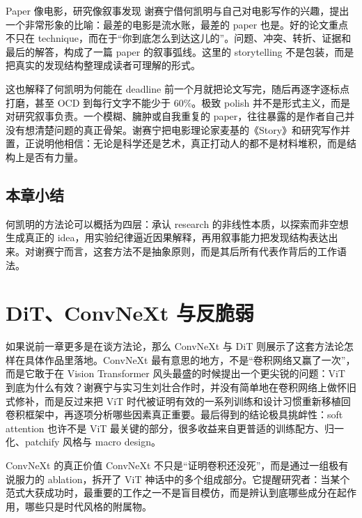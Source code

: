 \documentclass[a4paper,12pt]{article}
\begin{document}
\begin{importantbox}{Paper 像电影，研究像叙事发现}
谢赛宁借何凯明与自己对电影写作的兴趣，提出一个非常形象的比喻：最差的电影是流水账，最差的 paper 也是。好的论文重点不只在 technique，而在于“你到底怎么到达这儿的”。问题、冲突、转折、证据和最后的解答，构成了一篇 paper 的叙事弧线。这里的 storytelling 不是包装，而是把真实的发现结构整理成读者可理解的形式。
\end{importantbox}

这也解释了何凯明为何能在 deadline 前一个月就把论文写完，随后再逐字逐标点打磨，甚至 OCD 到每行文字不能少于 60\%。极致 polish 并不是形式主义，而是对研究叙事负责。一个模糊、臃肿或自我重复的 paper，往往暴露的是作者自己并没有想清楚问题的真正骨架。谢赛宁把电影理论家麦基的《Story》和研究写作并置，正说明他相信：无论是科学还是艺术，真正打动人的都不是材料堆积，而是结构上是否有力量。

\subsection{本章小结}

何凯明的方法论可以概括为四层：承认 research 的非线性本质，以探索而非空想生成真正的 idea，用实验纪律逼近因果解释，再用叙事能力把发现结构表达出来。对谢赛宁而言，这套方法不是抽象原则，而是其后所有代表作背后的工作语法。

\section{DiT、ConvNeXt 与反脆弱}

如果说前一章更多是在谈方法论，那么 ConvNeXt 与 DiT 则展示了这套方法论怎样在具体作品里落地。ConvNeXt 最有意思的地方，不是“卷积网络又赢了一次”，而是它敢于在 Vision Transformer 风头最盛的时候提出一个更尖锐的问题：ViT 到底为什么有效？谢赛宁与实习生刘壮合作时，并没有简单地在卷积网络上做怀旧式修补，而是反过来把 ViT 时代被证明有效的一系列训练和设计习惯重新移植回卷积框架中，再逐项分析哪些因素真正重要。最后得到的结论极具挑衅性：soft attention 也许不是 ViT 最关键的部分，很多收益来自更普适的训练配方、归一化、patchify 风格与 macro design。

\begin{knowledgebox}{ConvNeXt 的真正价值}
ConvNeXt 不只是“证明卷积还没死”，而是通过一组极有说服力的 ablation，拆开了 ViT 神话中的多个组成部分。它提醒研究者：当某个范式大获成功时，最重要的工作之一不是盲目模仿，而是辨认到底哪些成分在起作用，哪些只是时代风格的附属物。
\end{knowledgebox}
\end{document}
